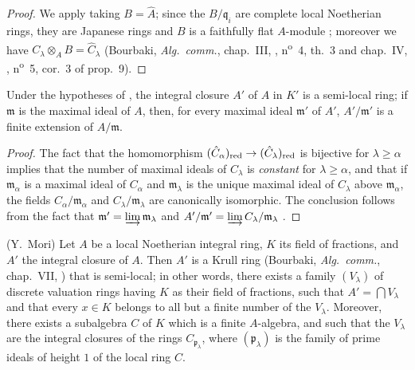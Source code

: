 \begin{proof}
We apply  taking $B=\hat{A}$; since the $B/\mathfrak{q}_i$ are complete local Noetherian rings, they are Japanese rings  and $B$ is a faithfully flat $A$-module ; moreover we have $C_\lambda\otimes_A B=\hat{C}_\lambda$ (Bourbaki, \emph{Alg.~comm.}, chap.~III, , n\textsuperscript{o}~4, th.~3 and chap.~IV, , n\textsuperscript{o}~5, cor.~3 of prop.~9).
\end{proof}

\begin{corollary}[23.2.6]
\label{0.23.2.6}
Under the hypotheses of , the integral closure $A'$ of $A$ in $K'$ is a semi-local ring; if $\mathfrak{m}$ is the maximal ideal of $A$, then, for every maximal ideal $\mathfrak{m}'$ of $A'$, $A'/\mathfrak{m}'$ is a finite extension of $A/\mathfrak{m}$.
\end{corollary}

\begin{proof}
The fact that the homomorphism $(\hat{C}_\alpha)_{\mathrm{red}}\to(\hat{C}_\lambda)_{\mathrm{red}}$ is bijective for $\lambda\geq\alpha$ implies that the number of maximal ideals of $C_\lambda$ is \emph{constant} for $\lambda\geq\alpha$, and that if $\mathfrak{m}_\alpha$ is a maximal ideal of $C_\alpha$ and $\mathfrak{m}_\lambda$ is the unique maximal ideal of $C_\lambda$ above $\mathfrak{m}_\alpha$, the fields $C_\alpha/\mathfrak{m}_\alpha$ and $C_\lambda/\mathfrak{m}_\lambda$ are canonically isomorphic.
The conclusion follows from the fact that $\mathfrak{m}'=\varinjlim\mathfrak{m}_\lambda$ and $A'/\mathfrak{m}'=\varinjlim C_\lambda/\mathfrak{m}_\lambda$ .
\end{proof}

\begin{proposition}[23.2.7]
\label{0.23.2.7}
\textnormal{(Y.~Mori)}
Let $A$ be a local Noetherian integral ring, $K$ its field of fractions, and $A'$ the integral closure of $A$.
Then $A'$ is a Krull ring \textnormal{(Bourbaki, \emph{Alg.~comm.}, chap.~VII, )} that is semi-local; in other words, there exists a family $(V_\lambda)$ of discrete valuation rings having $K$ as their field of fractions, such that $A'=\bigcap V_\lambda$ and that every $x\in K$ belongs to all but a finite number of the $V_\lambda$.
Moreover, there exists a subalgebra $C$ of $K$ which is a finite $A$-algebra, and such that the $V_\lambda$ are the integral closures of the rings $C_{\mathfrak{p}_\lambda}$, where $(\mathfrak{p}_\lambda)$ is the family of prime ideals of height $1$ of the local ring $C$.
\end{proposition}

